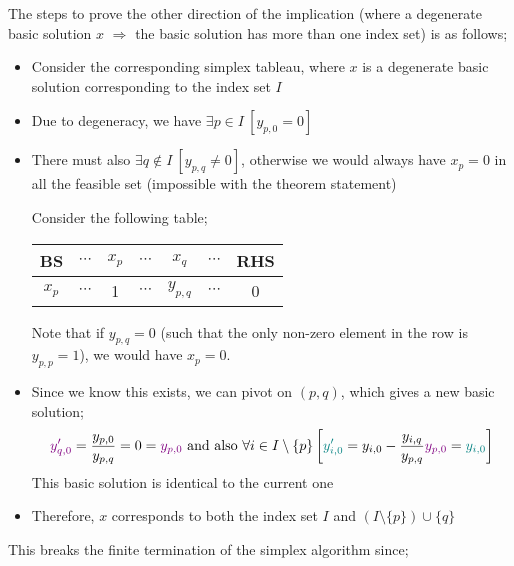 \documentclass[a4paper, 12pt]{article}
\newcommand{\violet}[1]{\textcolor{violet}{#1}}
\newcommand{\teal}[1]{\textcolor{teal}{#1}}
\begin{document}
                The steps to prove the other direction of the implication (where a degenerate basic solution $x$ $\Rightarrow$ the basic solution has more than one index set) is as follows;
                \begin{itemize}
                    \itemsep0em
                    \item Consider the corresponding simplex tableau, where $x$ is a degenerate basic solution corresponding to the index set $I$
                    \item Due to degeneracy, we have $\exists p \in I\ [y_{p, 0} = 0]$
                    \item There must also $\exists q \notin I\ [y_{p, q} \neq 0]$, otherwise we would always have $x_p = 0$ in all the feasible set (impossible with the theorem statement)
                        \smallskip

                        Consider the following table;
                        \begin{center}
                            \begin{tabular}{c|ccccc|c}
                                BS & $\cdots$ & $x_p$ & $\cdots$ & $x_q$ & $\cdots$ & RHS \\
                                \hline
                                $x_p$ & $\cdots$ & 1 & $\cdots$ & $y_{p, q}$ & $\cdots$ & 0
                            \end{tabular}
                        \end{center}
                        Note that if $y_{p, q} = 0$ (such that the only non-zero element in the row is $y_{p, p} = 1$), we would have $x_p = 0$.
                    \item Since we know this exists, we can pivot on $(p, q)$, which gives a new basic solution;
                        $$\violet{y^\prime_{q, 0}} = \frac{y_{p, 0}}{y_{p, q}} = 0 = \violet{y_{p, 0}} \text{   and also   } \forall i \in I \setminus \{p\} \left[\teal{y^\prime_{i, 0}} = y_{i, 0} - \frac{y_{i, q}}{y_{p, q}}\violet{y_{p, 0}} = \teal{y_{i, 0}}\right]$$
                        This basic solution is identical to the current one
                    \item Therefore, $x$ corresponds to both the index set $I$ and $(I \setminus \{p\}) \cup \{q\}$
                \end{itemize}
                This breaks the finite termination of the simplex algorithm since;
\end{document}
